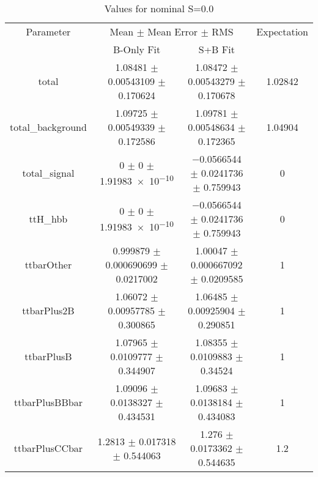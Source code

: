 \begin{table}
\centering
\caption{Values for nominal S=0.0}
\begin{tabular}{cccc}
\toprule
Parameter & \multicolumn{2}{c}{Mean $\pm$ Mean Error $\pm$ RMS} & Expectation\\
 & B-Only Fit & S+B Fit & \\
\midrule
total & \num{1.08481} $\pm$ \num{0.00543109} $\pm$ \num{0.170624} & \num{1.08472} $\pm$ \num{0.00543279} $\pm$ \num{0.170678} & \num{1.02842}\\
total\_background & \num{1.09725} $\pm$ \num{0.00549339} $\pm$ \num{0.172586} & \num{1.09781} $\pm$ \num{0.00548634} $\pm$ \num{0.172365} & \num{1.04904}\\
total\_signal & \num{0} $\pm$ \num{0} $\pm$ \num{1.91983e-10} & \num{-0.0566544} $\pm$ \num{0.0241736} $\pm$ \num{0.759943} & \num{0}\\
ttH\_hbb & \num{0} $\pm$ \num{0} $\pm$ \num{1.91983e-10} & \num{-0.0566544} $\pm$ \num{0.0241736} $\pm$ \num{0.759943} & \num{0}\\
ttbarOther & \num{0.999879} $\pm$ \num{0.000690699} $\pm$ \num{0.0217002} & \num{1.00047} $\pm$ \num{0.000667092} $\pm$ \num{0.0209585} & \num{1}\\
ttbarPlus2B & \num{1.06072} $\pm$ \num{0.00957785} $\pm$ \num{0.300865} & \num{1.06485} $\pm$ \num{0.00925904} $\pm$ \num{0.290851} & \num{1}\\
ttbarPlusB & \num{1.07965} $\pm$ \num{0.0109777} $\pm$ \num{0.344907} & \num{1.08355} $\pm$ \num{0.0109883} $\pm$ \num{0.34524} & \num{1}\\
ttbarPlusBBbar & \num{1.09096} $\pm$ \num{0.0138327} $\pm$ \num{0.434531} & \num{1.09683} $\pm$ \num{0.0138184} $\pm$ \num{0.434083} & \num{1}\\
ttbarPlusCCbar & \num{1.2813} $\pm$ \num{0.017318} $\pm$ \num{0.544063} & \num{1.276} $\pm$ \num{0.0173362} $\pm$ \num{0.544635} & \num{1.2}\\
\bottomrule
\end{tabular}
\end{table}
